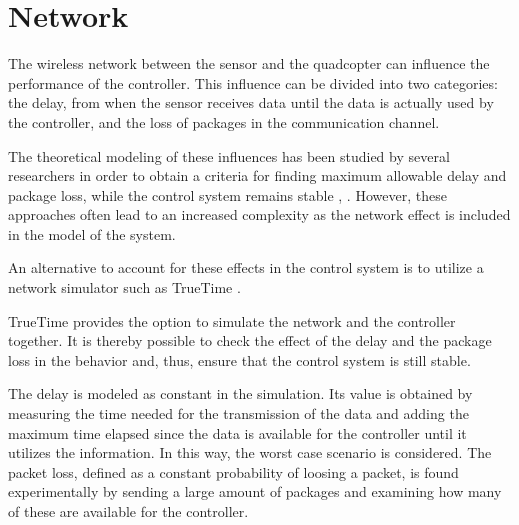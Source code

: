 \section{Network}
The wireless network between the sensor and the quadcopter can influence the performance of the controller. This influence can be divided into two categories: the delay, from when the sensor receives data until the data is actually used by the controller, and the loss of packages in the communication channel.


The theoretical modeling of these influences has been studied by several researchers in order to obtain a criteria for finding maximum allowable delay and package loss, while the control system remains stable  \cite{ling}, \cite{nirupam}. However, these approaches often lead to an increased complexity as the network effect is included in the model of the system.

An alternative to account for these effects in the control system is to utilize a network simulator such as TrueTime \cite{TrueTimeNew}.

TrueTime provides the option to simulate the network and the controller together. It is thereby possible to check the effect of the delay and the package loss in the behavior and, thus, ensure that the control system is still stable.

The delay is modeled as constant in the simulation. Its value is obtained by measuring the time needed for the transmission of the data and adding the maximum time elapsed since the data is available for the controller until it utilizes the information. In this way, the worst case scenario is considered. The packet loss, defined as a constant probability of loosing a packet, is found experimentally by sending a large amount of packages and examining how many of these are available for the controller.
%

